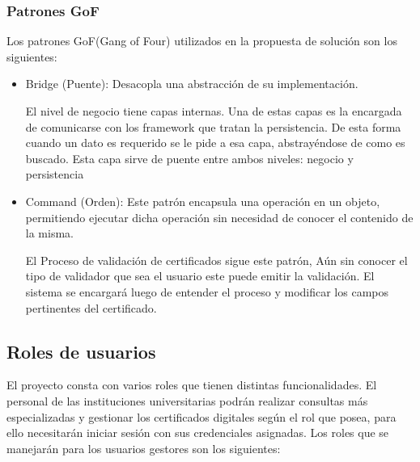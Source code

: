 \subsubsection{Patrones GoF}
Los patrones GoF(Gang of Four) utilizados en la propuesta de solución son los siguientes:

\begin{itemize}
	\item Bridge (Puente): Desacopla una abstracción de su implementación.
	
	El nivel de negocio tiene capas internas. Una de estas capas es la encargada de comunicarse con los framework que tratan la persistencia. De esta forma cuando un dato es requerido se le pide a esa capa, abstrayéndose de como es buscado. Esta capa sirve de puente entre ambos niveles: negocio y persistencia
	
	\item Command (Orden): Este patrón encapsula una operación en un objeto, permitiendo ejecutar dicha operación sin necesidad de conocer el contenido de la misma.
	
	El Proceso de validación de certificados sigue este patrón, Aún sin conocer el tipo de validador que sea
	el usuario este puede emitir la validación. El sistema se encargará luego de entender el proceso y modificar los campos pertinentes del certificado.	
\end{itemize}

\subsection{Roles de usuarios}

El proyecto consta con varios roles que tienen distintas funcionalidades. El personal de las instituciones universitarias podrán realizar consultas más especializadas y gestionar los certificados digitales según el rol que posea, para ello necesitarán iniciar sesión con sus credenciales asignadas. Los roles que se manejarán para los usuarios gestores son los siguientes:


